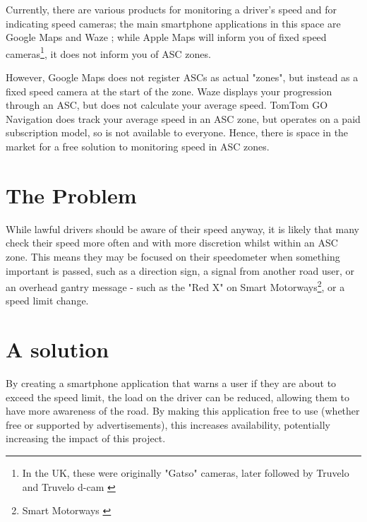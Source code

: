 \documentclass[11pt, a4paper, notitlepage]{report}
\begin{document}
Currently, there are various products for monitoring a driver's speed and for indicating speed cameras; the main smartphone applications in this space are Google Maps \citep{googleMaps} and Waze \citep{waze}; while Apple Maps \citep{appleMaps} will inform you of fixed speed cameras\footnote{In the UK, these were originally "Gatso" cameras, later followed by Truvelo and Truvelo d-cam \citep{dcam}}, it does not inform you of ASC zones.

However, Google Maps does not register ASCs as actual "zones", but instead as a fixed speed camera at the start of the zone. Waze displays your progression through an ASC, but does not calculate your average speed. TomTom GO Navigation \citep{tomtomGo} does track your average speed in an ASC zone, but operates on a paid subscription model, so is not available to everyone. Hence, there is space in the market for a free solution to monitoring speed in ASC zones.
\section{The Problem}
While lawful drivers should be aware of their speed anyway, it is likely that many check their speed more often and with more discretion whilst within an ASC zone. This means they may be focused on their speedometer when something important is passed, such as a direction sign, a signal from another road user, or an overhead gantry message - such as the "Red X" on Smart Motorways\footnote{Smart Motorways \citep{SmartMotorways}}, or a speed limit change. 
\section{A solution}
By creating a smartphone application that warns a user if they are about to 
exceed the speed limit, the load on the driver can be reduced, allowing them to 
have more awareness of the road. By making this application free to use 
(whether free or supported by advertisements), this increases availability, 
potentially increasing the impact of this project.
\end{document}
